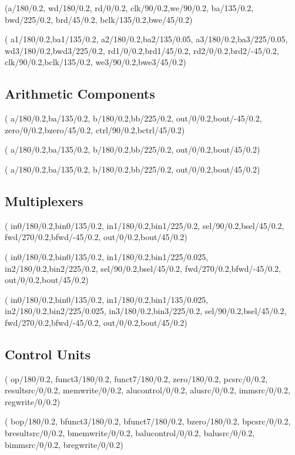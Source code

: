 \documentclass[.52pt,a4paper,titlepage]{article}
\begin{document}
(a/180/0.2, wd/180/0.2, rd/0/0.2, clk/90/0.2,we/90/0.2, ba/135/0.2, bwd/225/0.2, brd/45/0.2, bclk/135/0.2,bwe/45/0.2)

(
a1/180/0.2,ba1/135/0.2,
a2/180/0.2,ba2/135/0.05,
a3/180/0.2,ba3/225/0.05,
wd3/180/0.2,bwd3/225/0.2,
rd1/0/0.2,brd1/45/0.2,
rd2/0/0.2,brd2/-45/0.2,
clk/90/0.2,bclk/135/0.2,
we3/90/0.2,bwe3/45/0.2)

\subsection{Arithmetic Components}
(
a/180/0.2,ba/135/0.2,
b/180/0.2,bb/225/0.2,
out/0/0.2,bout/-45/0.2,
zero/0/0.2,bzero/45/0.2,
ctrl/90/0.2,bctrl/45/0.2)


(
a/180/0.2,ba/135/0.2,
b/180/0.2,bb/225/0.2,
out/0/0.2,bout/45/0.2)


(
a/180/0.2,ba/135/0.2,
b/180/0.2,bb/225/0.2,
out/0/0.2,bout/45/0.2)

\subsection{Multiplexers}
(
in0/180/0.2,bin0/135/0.2,
in1/180/0.2,bin1/225/0.2,
sel/90/0.2,bsel/45/0.2,
fwd/270/0.2,bfwd/-45/0.2,
out/0/0.2,bout/45/0.2)

(
in0/180/0.2,bin0/135/0.2,
in1/180/0.2,bin1/225/0.025,
in2/180/0.2,bin2/225/0.2,
sel/90/0.2,bsel/45/0.2,
fwd/270/0.2,bfwd/-45/0.2,
out/0/0.2,bout/45/0.2)

(
in0/180/0.2,bin0/135/0.2,
in1/180/0.2,bin1/135/0.025,
in2/180/0.2,bin2/225/0.025,
in3/180/0.2,bin3/225/0.2,
sel/90/0.2,bsel/45/0.2,
fwd/270/0.2,bfwd/-45/0.2,
out/0/0.2,bout/45/0.2)

\subsection{Control Units}
(
op/180/0.2,
funct3/180/0.2,
funct7/180/0.2,
zero/180/0.2,
pcsrc/0/0.2,
resultsrc/0/0.2,
memwrite/0/0.2,
alucontrol/0/0.2,
alusrc/0/0.2,
immsrc/0/0.2,
regwrite/0/0.2)

(
bop/180/0.2,
bfunct3/180/0.2,
bfunct7/180/0.2,
bzero/180/0.2,
bpcsrc/0/0.2,
bresultsrc/0/0.2,
bmemwrite/0/0.2,
balucontrol/0/0.2,
balusrc/0/0.2,
bimmsrc/0/0.2,
bregwrite/0/0.2)
\end{document}
